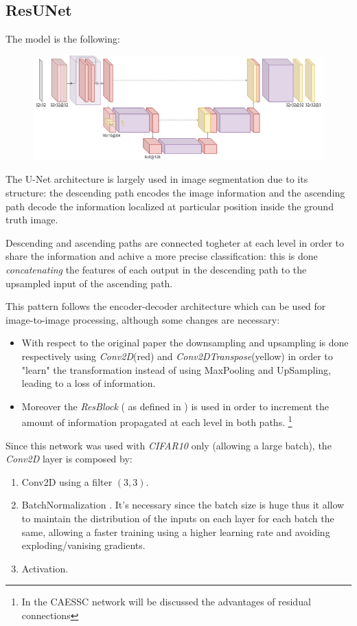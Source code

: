 \subsection{ResUNet}
The model is the following:
\begin{figure}[H]
    \centering
    \includegraphics[scale=0.3]{subsections/resunet/resunet.png}
\end{figure}


The U-Net \cite{unet} architecture is largely used in image segmentation due to its structure: the descending path encodes the image information and the ascending path decode the information localized at particular position inside the ground truth image.

Descending and ascending paths are connected togheter at each level in order to share the information and achive a more precise classification: this is done \textit{concatenating} the features of each output in the descending path to the upsampled input of the ascending path.  

This pattern follows the encoder-decoder architecture which can be used for image-to-image processing, although some changes are necessary:
\begin{itemize}
    \item With respect to the original paper the downsampling and upsampling is done respectively using \textit{Conv2D}(red) and \textit{Conv2DTranspose}(yellow) in order to "learn" the transformation instead of using MaxPooling and UpSampling, leading to a loss of information.
    \item Moreover the \textit{ResBlock} ( as defined in \cite{resnet} ) is used in order to increment the amount of information propagated at each level in both paths. \footnote{In the CAESSC network will be discussed the advantages of residual connections}
\end{itemize}

Since this network was used with \textit{CIFAR10} only (allowing a large batch), the \textit{Conv2D} layer is composed by:
\begin{enumerate}
    \item Conv2D using a filter $(3,3)$.
    \item BatchNormalization \cite{BN}. It's necessary since the batch size is huge thus it allow to maintain the distribution of the inputs on each layer for each batch the same, allowing a faster training using a higher learning rate and avoiding exploding/vanising gradients.
    \item Activation.
\end{enumerate}

